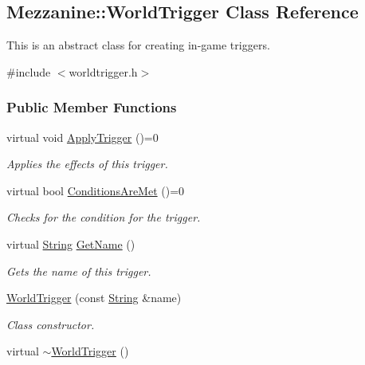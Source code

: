 \hypertarget{classMezzanine_1_1WorldTrigger}{
\subsection{Mezzanine::WorldTrigger Class Reference}
\label{classMezzanine_1_1WorldTrigger}
}


This is an abstract class for creating in-\/game triggers.  




{\ttfamily \#include $<$worldtrigger.h$>$}

\subsubsection*{Public Member Functions}
\begin{DoxyCompactItemize}
\item 
\hypertarget{classMezzanine_1_1WorldTrigger_abbe8c0195fd7b9bc3c93f6c8b20d843b}{
virtual void \hyperlink{classMezzanine_1_1WorldTrigger_abbe8c0195fd7b9bc3c93f6c8b20d843b}{ApplyTrigger} ()=0}
\label{classMezzanine_1_1WorldTrigger_abbe8c0195fd7b9bc3c93f6c8b20d843b}

\begin{DoxyCompactList}\small\item\em Applies the effects of this trigger. \item\end{DoxyCompactList}\item 
virtual bool \hyperlink{classMezzanine_1_1WorldTrigger_ae7a24ce175086bcd6e77f10d14c84b34}{ConditionsAreMet} ()=0
\begin{DoxyCompactList}\small\item\em Checks for the condition for the trigger. \item\end{DoxyCompactList}\item 
virtual \hyperlink{namespaceMezzanine_acf9fcc130e6ebf08e3d8491aebcf1c86}{String} \hyperlink{classMezzanine_1_1WorldTrigger_a20303907a5b0a0873951a24de5ee4c00}{GetName} ()
\begin{DoxyCompactList}\small\item\em Gets the name of this trigger. \item\end{DoxyCompactList}\item 
\hyperlink{classMezzanine_1_1WorldTrigger_afc43e40a268f0573db5b80bed976563d}{WorldTrigger} (const \hyperlink{namespaceMezzanine_acf9fcc130e6ebf08e3d8491aebcf1c86}{String} \&name)
\begin{DoxyCompactList}\small\item\em Class constructor. \item\end{DoxyCompactList}\item 
\hypertarget{classMezzanine_1_1WorldTrigger_abf4b164bc629f4c7a9e5cfb8dfcf919f}{
virtual \hyperlink{classMezzanine_1_1WorldTrigger_abf4b164bc629f4c7a9e5cfb8dfcf919f}{$\sim$WorldTrigger} ()}
\label{classMezzanine_1_1WorldTrigger_abf4b164bc629f4c7a9e5cfb8dfcf919f}


\end{DoxyCompactItemize}
